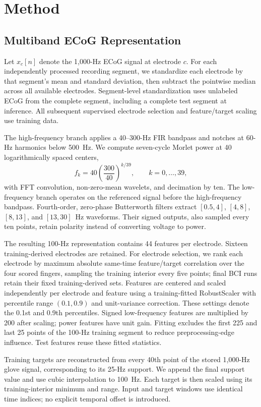 \section{Method}
\subsection{Multiband ECoG Representation}
Let $x_c[n]$ denote the 1,000-Hz ECoG signal at electrode $c$. For each independently processed recording segment, we standardize each electrode by that segment's mean and standard deviation, then subtract the pointwise median across all available electrodes. Segment-level standardization uses unlabeled ECoG from the complete segment, including a complete test segment at inference. All subsequent supervised electrode selection and feature/target scaling use training data.

The high-frequency branch applies a 40--300-Hz FIR bandpass and notches at 60-Hz harmonics below 500~Hz. We compute seven-cycle Morlet power at 40 logarithmically spaced centers,
\begin{equation}
f_k=40\left(\frac{300}{40}\right)^{k/39},\qquad k=0,\ldots,39,
\end{equation}
with FFT convolution, non-zero-mean wavelets, and decimation by ten. The low-frequency branch operates on the referenced signal before the high-frequency bandpass. Fourth-order, zero-phase Butterworth filters extract $[0.5,4]$, $[4,8]$, $[8,13]$, and $[13,30]$~Hz waveforms. Their signed outputs, also sampled every ten points, retain polarity instead of converting voltage to power.

The resulting 100-Hz representation contains 44 features per electrode. Sixteen training-derived electrodes are retained. For electrode selection, we rank each electrode by maximum absolute same-time feature/target correlation over the four scored fingers, sampling the training interior every five points; final BCI runs retain their fixed training-derived sets. Features are centered and scaled independently per electrode and feature using a training-fitted RobustScaler with percentile range $(0.1,0.9)$ and unit-variance correction. These settings denote the 0.1st and 0.9th percentiles. Signed low-frequency features are multiplied by 200 after scaling; power features have unit gain. Fitting excludes the first 225 and last 25 points of the 100-Hz training segment to reduce preprocessing-edge influence. Test features reuse these fitted statistics.

Training targets are reconstructed from every 40th point of the stored 1,000-Hz glove signal, corresponding to its 25-Hz support. We append the final support value and use cubic interpolation to 100~Hz. Each target is then scaled using its training-interior minimum and range. Input and target windows use identical time indices; no explicit temporal offset is introduced.



